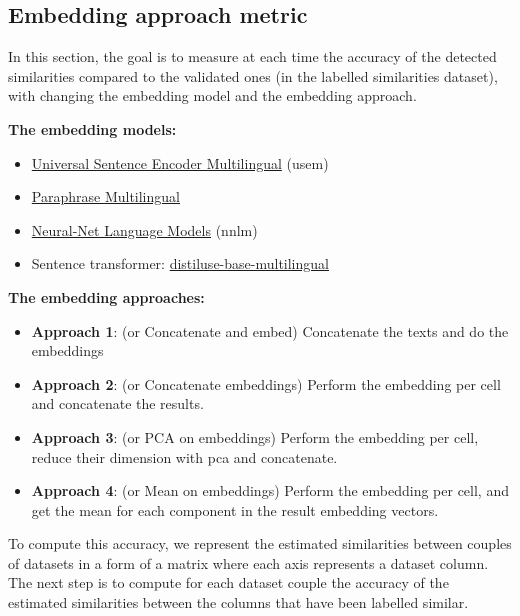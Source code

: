 
\subsection{Embedding approach metric}
In this section, the goal is to measure at each time the accuracy of the
detected similarities compared to the validated ones (in the labelled
similarities dataset), with changing the embedding model and the embedding
approach.

\begin{multicols}{2}
    \textbf{The embedding models:}
    \begin{itemize}
        \item \href{https://tfhub.dev/google/universal-sentence-encoder/4}
              {Universal Sentence Encoder Multilingual} (\acrshort{usem})
        \item
              \href{https://huggingface.co/sentence-transformers/paraphrase-multilingual-MiniLM-L12-v2}
              {Paraphrase Multilingual}
        \item
              \href{https://tfhub.dev/google/nnlm-en-dim50-with-normalization/2}
              {Neural-Net Language Models} (\acrshort{nnlm})
        \item Sentence transformer:
              \href{https://huggingface.co/sentence-transformers/distiluse-base-multilingual-cased-v2}
              {distiluse-base-multilingual}
    \end{itemize}
    \columnbreak
    \textbf{The embedding approaches:}
    \begin{itemize}
        \item \textbf{Approach 1}: (or Concatenate and embed) Concatenate the texts and do the embeddings
        \item \textbf{Approach 2}: (or Concatenate embeddings) Perform the embedding per cell and concatenate the results.
        \item \textbf{Approach 3}: (or PCA on embeddings) Perform the embedding per cell, reduce their dimension with
              \acrshort{pca} and concatenate.
        \item \textbf{Approach 4}: (or Mean on embeddings) Perform the embedding per cell, and get the mean for each
              component in the result embedding vectors.
    \end{itemize}
\end{multicols}

To compute this accuracy, we represent the estimated similarities between couples
of datasets in a form of a matrix where each axis represents a dataset column. The
next step is to compute for each dataset couple the accuracy of the estimated
similarities between the columns that have been labelled similar.

